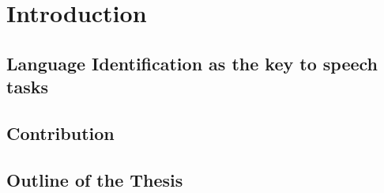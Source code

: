 \section{Introduction}

\subsection{Language Identification as the key to speech tasks}
\subsection{Contribution}
\subsection{Outline of the Thesis}
